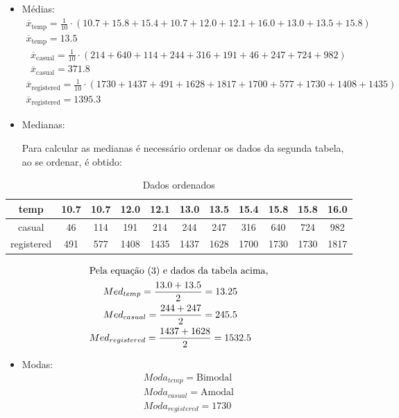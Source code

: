 \documentclass[a4paper, 12pt, titlepage]{article}
\begin{document}
\begin{itemize}
    \item Médias: 
    \begin{gather*}
        \overline{x}_{\text{temp}}=\frac{1}{10}\cdot(10.7+15.8+15.4+10.7+12.0+12.1+16.0+13.0+13.5+15.8)       \\ 
        \overline{x}_{\text{temp}}=13.5  
    \end{gather*}
    \begin{gather*}
        \overline{x}_{\text{casual}}=\frac{1}{10}\cdot(214+640+114+244+316+191+46+247+724+982)       \\ 
        \overline{x}_{\text{casual}}=371.8  
    \end{gather*}
    \begin{gather*}
        \overline{x}_{\text{registered}}=\frac{1}{10}\cdot(1730+1437+491+1628+1817+1700+577+1730+1408+1435)       \\ 
        \overline{x}_{\text{registered}}=1395.3
    \end{gather*}
    \item Medianas: 
    
    Para calcular as medianas é necessário ordenar os dados da segunda tabela, ao se ordenar, é obtido:
\end{itemize}
\vspace*{-6mm}
    \begin{table}[h!]
        \centering
        \caption{Dados ordenados}
        \label{tab:mascara_3u}
        \begin{tabular}{|c|c|c|c|c|c|c|c|c|c|c|}
            \hline
            temp &10.7 &10.7 &12.0 &12.1 &\color{red} 13.0 &\color{red}13.5 &15.4 &15.8 &15.8 &16.0 \\ \hline
            casual &46 &114 &191 &214 &\color{red} 244 &\color{red} 247 &316 &640 &724 &982 \\ \hline 
            registered &491 &577 &1408 &1435 &\color{red}1437 &\color{red}1628 &1700 &1730 &1730 &1817 \\
            \hline
        \end{tabular}
    \end{table}

\vspace*{-14mm}
    \begin{gather*}
        \intertext{Pela equação (3) e dados da tabela acima, } 
        Med_{temp}=\frac{13.0+13.5}{2}=13.25 \\
        Med_{casual}= \frac{244+247}{2}=245.5 \\
        Med_{registered}= \frac{1437+1628}{2}=1532.5
    \end{gather*}
\begin{itemize}
    \item Modas:
    \begin{gather*}
        Moda_{temp}= \text{Bimodal} \\
        Moda_{casual}= \text{Amodal}\\
        Moda_{registered}= 1730
    \end{gather*}
\end{itemize}
\end{document}
